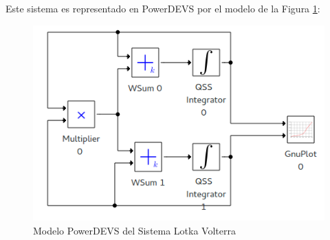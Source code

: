 	Este sistema es representado en PowerDEVS por el modelo de la Figura \ref{model:lotka_volterra}:

\begin{figure}[H]
\includegraphics[width=0.75\linewidth]{lotka_voltera_pwd}
\caption{Modelo PowerDEVS del Sistema Lotka Volterra}
\label{model:lotka_volterra}
\end{figure}

